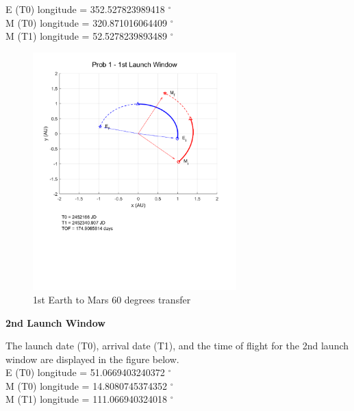 \documentclass[conf]{new-aiaa}
\begin{document}
E (T0) longitude = 352.527823989418 $^\circ$ \\ 

M (T0) longitude = 320.871016064409 $^\circ$ \\ 

M (T1) longitude = 52.5278239893489 $^\circ$ 

\begin{figure}[H]
    \centering 
    \includegraphics[width=0.7\textwidth]{Prob 1 - 1st Launch Window.pdf}
    \caption{1st Earth to Mars 60 degrees transfer}
\end{figure}

\textbf{2nd Launch Window}

The launch date (T0), arrival date (T1), and the time of flight for the 2nd launch window are displayed in the figure below. \\ 

E (T0) longitude = 51.0669403240372 $^\circ$ \\ 

M (T0) longitude = 14.8080745374352 $^\circ$ \\

M (T1) longitude = 111.066940324018 $^\circ$ 
\end{document}
